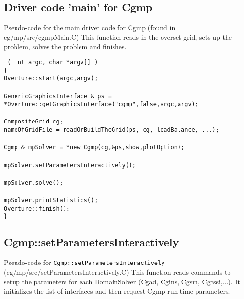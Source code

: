 \newcommand{\WHILE}{{\blue while}}
\newcommand{\ELSE}{{\blue else}}

\subsection{Driver code 'main' for Cgmp}
Pseudo-code for the main driver code for Cgmp (found in cg/mp/src/cgmpMain.C)
This function reads in the overset grid, sets up the problem, solves the problem and finishes.

\begin{flushleft}\tt\small
{}( int argc, char *argv[] ) \\
\{  \\
\ia Overture::start(argc,argv);   \\ 
\ia {}  \\
\ia  GenericGraphicsInterface \& ps = *Overture::getGraphicsInterface("cgmp",false,argc,argv); \\
\ia \\ 
\ia  CompositeGrid cg;  \\ 
\ia  nameOfGridFile = readOrBuildTheGrid(ps, cg, loadBalance, ...);  \\
\ia \\ 
\ia  Cgmp \& mpSolver = *new Cgmp(cg,\&ps,show,plotOption); \\
\ia \\
\ia  mpSolver.setParametersInteractively();  \\
\ia \\
\ia  mpSolver.solve();           \\
\ia \\
\ia  mpSolver.printStatistics();  \\
\ia  Overture::finish();  \\
\}
\end{flushleft}



\subsection{Cgmp::setParametersInteractively}
Pseudo-code for {\tt Cgmp::setParametersInteractively} (cg/mp/src/setParametersInteractively.C)
This function reads commands to setup the parameters for each DomainSolver (Cgad, Cgins, Cgsm, Cgcssi,...).
It initializes the list of interfaces and then request Cgmp run-time parameters.

